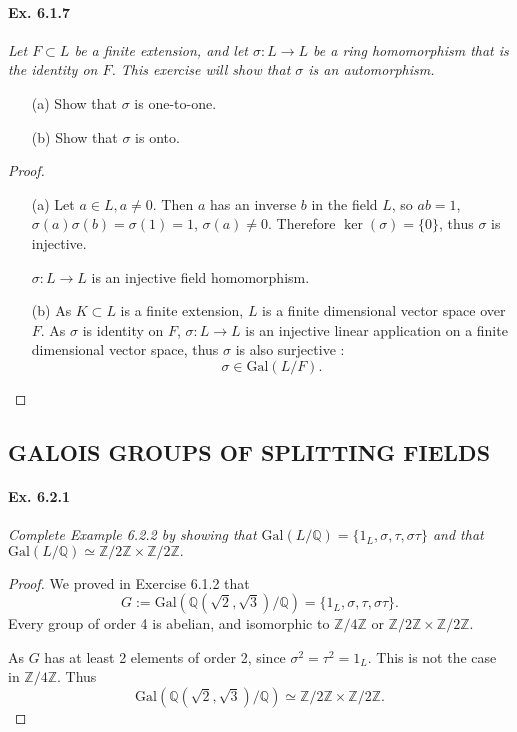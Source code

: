 \documentclass[11pt,a4paper]{article}
\newcommand{\Q}{\mathbb{Q}}
\newcommand{\Z}{\mathbb{Z}}
\newcommand{\Gal}{\mathrm{Gal}}
\begin{document}
\paragraph{Ex. 6.1.7} 
{\it Let $F \subset L$ be a finite extension, and let $\sigma : L \to L$ be a ring homomorphism that is the identity on $F$. This exercise will show that $\sigma$ is an automorphism.
\begin{enumerate}
\item[(a)] Show that $\sigma$ is one-to-one.
\item[(b)] Show that $\sigma$ is onto.
\end{enumerate}
}

\begin{proof}
\begin{enumerate}
\item[(a)]
Let $a \in L, a\neq 0$. Then $a$ has an inverse $b$ in the field $L$, so $ab=1$, $\sigma(a) \sigma(b) = \sigma(1) = 1 $, $\sigma(a) \neq 0$. Therefore $\ker(\sigma) =\{0\}$, thus $\sigma$ is injective.

$\sigma : L \to L$ is an injective field homomorphism.

\item[(b)]
As $K \subset L$ is a finite extension, $L$ is a finite dimensional vector space over $F$. As $\sigma$ is identity on $F$, $\sigma : L \to L$ is an injective linear application on a finite dimensional vector space, thus $\sigma$ is also surjective :   $$\sigma \in \mathrm{Gal}(L/F).$$
\end{enumerate}
\end{proof}

\subsection{GALOIS GROUPS OF SPLITTING FIELDS}
\paragraph{Ex. 6.2.1}

{\it Complete Example 6.2.2 by showing that $\Gal(L/\Q) = \{1_L,\sigma, \tau, \sigma \tau\}$ and that
$\Gal(L/\Q)\simeq \Z/2\Z \times \Z/2\Z.$
}

\begin{proof}
We proved in Exercise 6.1.2 that $$ G:= \mathrm{Gal}(\Q(\sqrt{2},\sqrt{3})/\Q) =\{1_L, \sigma, \tau, \sigma \tau\}.$$
Every group of order 4 is abelian, and isomorphic to $\Z/4\Z$ or $\Z/2\Z \times \Z/2\Z$.

As $G$ has at least 2 elements of order 2, since $\sigma^2 = \tau^2 = 1_L$. This is not the case in  $\Z/4\Z$. Thus 
$$\mathrm{Gal}(\Q(\sqrt{2},\sqrt{3})/\Q) \simeq \Z/2\Z \times \Z/2\Z.$$
\end{proof}
\end{document}
